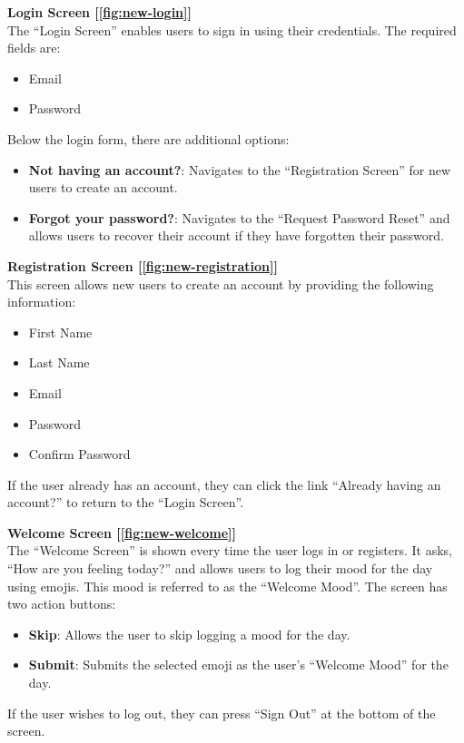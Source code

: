 \noindent \textbf{Login Screen [\ref{fig:new-login}]} \\
The ``Login Screen'' enables users to sign in using their credentials. The required fields are:
\begin{itemize}
    \item Email
    \item Password
\end{itemize}
\noindent Below the login form, there are additional options:
\begin{itemize}
    \item \textbf{Not having an account?}: Navigates to the ``Registration Screen'' for new users to create an account.
    \item \textbf{Forgot your password?}: Navigates to the ``Request Password Reset'' and allows users to recover their account if they have forgotten their password.
\end{itemize}

\vspace{5mm}

\noindent \textbf{Registration Screen [\ref{fig:new-registration}]} \\
This screen allows new users to create an account by providing the following information:
\begin{itemize}
    \item First Name
    \item Last Name
    \item Email
    \item Password
    \item Confirm Password
\end{itemize}
\noindent If the user already has an account, they can click the link ``Already having an account?'' to return to the ``Login Screen''.

\vspace{5mm}

\noindent \textbf{Welcome Screen [\ref{fig:new-welcome}]} \\
The ``Welcome Screen'' is shown every time the user logs in or registers. It asks, ``How are you feeling today?'' and allows users to log their mood for the day using emojis. This mood is referred to as the ``Welcome Mood''. The screen has two action buttons:
\begin{itemize}
    \item \textbf{Skip}: Allows the user to skip logging a mood for the day.
    \item \textbf{Submit}: Submits the selected emoji as the user's ``Welcome Mood'' for the day.
\end{itemize}
\noindent If the user wishes to log out, they can press ``Sign Out'' at the bottom of the screen.

